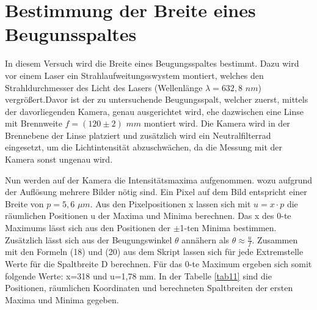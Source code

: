 \documentclass[../protokoll.tex]{subfiles}
\begin{document}
\section{Bestimmung der Breite eines Beugunsspaltes}
In diesem Versuch wird die Breite eines Beugungsspaltes bestimmt. Dazu wird vor einem Laser ein Strahlaufweitungsswystem montiert, welches den Strahldurchmesser des Licht des Lasers (Wellenlänge $\lambda=632,8$ $nm$) vergrößert.Davor ist der zu untersuchende Beugungsspalt, welcher zuerst, mittels der davorliegenden Kamera, genau ausgerichtet wird, ehe dazwischen eine Linse mit Brennweite $f=(120\pm 2)$ $mm$ montiert wird. Die Kamera wird in der Brennebene der Linse platziert und zusätzlich wird ein Neutralfilterrad eingesetzt, um die Lichtintensität abzuschwächen, da die Messung mit der Kamera sonst ungenau wird.

Nun werden auf der Kamera die Intensitätsmaxima aufgenommen. wozu aufgrund der Auflösung mehrere Bilder nötig sind. Ein Pixel auf dem Bild entspricht einer Breite von $p=5,6$ $\mu m$.
Aus den Pixelpositionen x lassen sich mit $u=x\cdot p$ die räumlichen Positionen u der Maxima und Minima berechnen.
Das x des 0-te Maximums lässt sich aus den Positionen der $\pm$1-ten Minima bestimmen. Zusätzlich lässt sich aus der Beugungswinkel $\theta$ annähern als $\theta \approx \frac{u}{f}$. Zusammen mit den Formeln (18) und (20) aus dem Skript \cite{script} lassen sich für jede Extremstelle Werte für die Spaltbreite D berechnen. Für das 0-te Maximum ergeben sich somit folgende Werte: x=318 und u=1,78 mm.  In der Tabelle \ref{tab11} sind die Positionen, räumlichen Koordinaten und berechneten Spaltbreiten der ersten Maxima und Minima gegeben.
\end{document}
